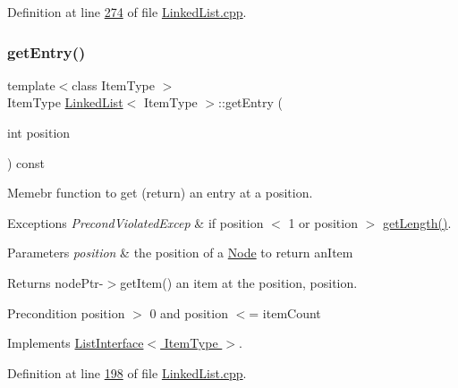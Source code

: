 Definition at line \hyperlink{LinkedList_8cpp_source_l00274}{274} of file \hyperlink{LinkedList_8cpp_source}{Linked\+List.\+cpp}.

\mbox{\label{classLinkedList_a341bfd7772c9d24d29eb7a7f3936915b}} 
\subsubsection{\texorpdfstring{get\+Entry()}{getEntry()}}
{\footnotesize\ttfamily template$<$class Item\+Type $>$ \\
Item\+Type \hyperlink{classLinkedList}{Linked\+List}$<$ Item\+Type $>$\+::get\+Entry (\begin{DoxyParamCaption}\item[{int}]{position }\end{DoxyParamCaption}) const\hspace{0.3cm}{\ttfamily [virtual]}}



Memebr function to get (return) an entry at a position. 


\begin{DoxyExceptions}{Exceptions}
{\em Precond\+Violated\+Excep} & if position $<$ 1 or position $>$ \hyperlink{classLinkedList_a61d045ef6008b494a1a516ecc992c0e7}{get\+Length()}.\\
\hline
\end{DoxyExceptions}

\begin{DoxyParams}{Parameters}
{\em position} & the position of a \hyperlink{classNode}{Node} to return an\+Item \\
\hline
\end{DoxyParams}
\begin{DoxyReturn}{Returns}
node\+Ptr-\/$>$get\+Item() an item at the position, position. 
\end{DoxyReturn}
\begin{DoxyPrecond}{Precondition}
position $>$ 0 and position $<$= item\+Count 
\end{DoxyPrecond}


Implements \hyperlink{classListInterface_a86987f69e5056d287212ede41db1956a}{List\+Interface$<$ Item\+Type $>$}.



Definition at line \hyperlink{LinkedList_8cpp_source_l00198}{198} of file \hyperlink{LinkedList_8cpp_source}{Linked\+List.\+cpp}.

